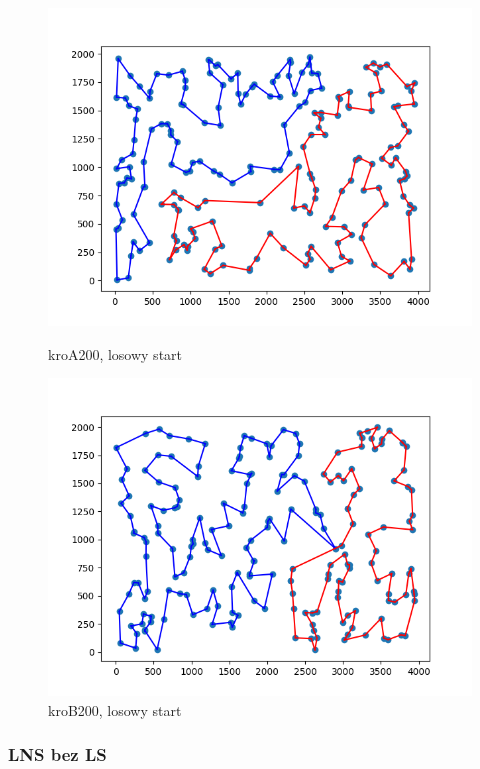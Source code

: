 \documentclass[11pt]{article}
\begin{document}
\begin{figure}[H]
    \begin{minipage}[t]{0.45\textwidth}
        \centering
        \includegraphics[width=\linewidth]{best_paths/kroA200/LNS}
        \caption{kroA200, losowy start}
    \end{minipage}
    \hfill
    \begin{minipage}[t]{0.45\textwidth}
        \centering
        \includegraphics[width=\linewidth]{best_paths/kroB200/LNS}
        \caption{kroB200, losowy start}
    \end{minipage}\label{fig:figure2}
\end{figure}


\subsubsection{LNS bez LS}
\end{document}
